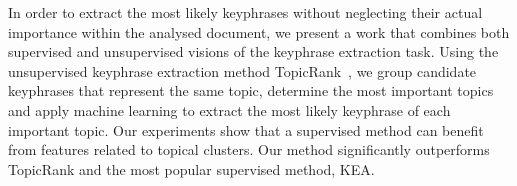   In order to extract the most likely keyphrases without neglecting their actual
  importance within the analysed document, we present a work that combines both
  supervised and unsupervised visions of the keyphrase extraction task. Using
  the unsupervised keyphrase extraction method
  Topic\-Rank~\cite{bougouin2013topicrank}, we group candidate keyphrases that
  represent the same topic, determine the most important topics and apply
  machine learning to extract the most likely keyphrase of each important topic.
  Our experiments show that a supervised method can benefit from features
  related to topical clusters. Our method significantly outperforms TopicRank
  and the most popular supervised method, KEA.


